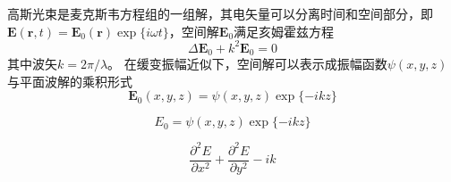 

高斯光束是麦克斯韦方程组的一组解，其电矢量可以分离时间和空间部分，即$\boldsymbol E(\boldsymbol r,t)=\boldsymbol E_0(\boldsymbol r)\exp\{i\omega t\}$，空间解$\boldsymbol E_0$满足亥姆霍兹方程
\begin{equation}
\Delta \boldsymbol E_0 + k^2 \boldsymbol E_0=0
\end{equation}
其中波矢$k=2\pi/\lambda$。
在缓变振幅近似下，空间解可以表示成振幅函数$\psi(x,y,z)$与平面波解的乘积形式
\begin{equation}
\boldsymbol E_0(x,y,z) = \psi(x,y,z)\exp\{-ikz\}
\end{equation}

\begin{equation}
E_0=\psi(x,y,z)\exp\{-ikz\}
\end{equation}


\begin{equation}
\frac{\partial^2 E}{\partial x^2} +\frac{\partial^2 E}{\partial y^2} -ik 
\end{equation}
